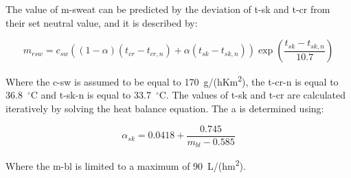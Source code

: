 The value of \ac{m-sweat} can be predicted by the deviation of \ac{t-sk} and \ac{t-cr} from their set neutral value, and it is described by:

\begin{equation}
    m_{rsw}=c_{sw}((1 - \alpha) (t_{cr} - t_{cr,n}) + \alpha (t_{sk} - t_{sk,n})) \exp (\frac{t_{sk}-t_{sk,n}}{10.7})\label{eq:regulatory-sweating}
\end{equation}

Where the \ac{c-sw} is assumed to be equal to 170~g/(hKm\textsuperscript{2}), the \ac{t-cr-n} is equal to 36.8~$^{\circ}$C and \ac{t-sk-n} is equal to 33.7~$^{\circ}$C\@.
The values of \ac{t-sk} and \ac{t-cr} are calculated iteratively by solving the heat balance equation.
The \ac{a} is determined using:

\begin{equation}
    \alpha_{sk}=0.0418+\frac{0.745}{m_{b l}-0.585}\label{eq:alpha}
\end{equation}

Where the \ac{m-bl} is limited to a maximum of 90~L/(hm\textsuperscript{2}).


